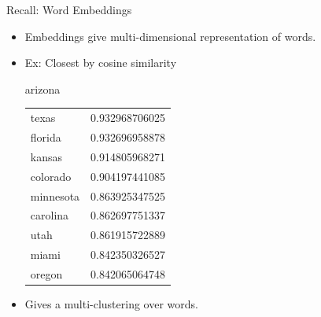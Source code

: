 \documentclass{beamer}
\begin{document}
\begin{frame}{Recall: Word Embeddings}
  \begin{itemize}
  \item Embeddings give multi-dimensional representation of words. 

    \item Ex: Closest by cosine similarity

      \begin{small}
        \begin{center}
          arizona
          \begin{tabular}{ll}
            texas& 0.932968706025 \\
            florida & 0.932696958878\\
            kansas&0.914805968271\\
            colorado&0.904197441085\\
            minnesota&0.863925347525\\
            carolina&0.862697751337\\
            utah& 0.861915722889\\
            miami&0.842350326527\\
            oregon&0.842065064748\\
          \end{tabular}
        \end{center}
      \end{small}
    \item Gives a multi-clustering over words. 
  \end{itemize}
\end{frame}
\end{document}
